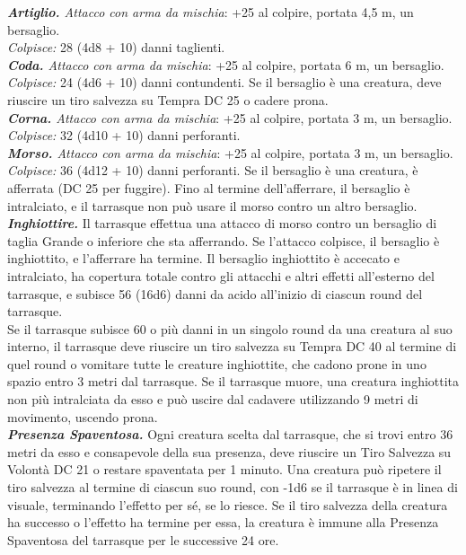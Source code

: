 \begin{multicols}{2}
\emph{\textbf{Artiglio.} Attacco con arma da mischia}: +25 al colpire, portata 4,5 m, un bersaglio.\\
\emph{Colpisce:} 28 (4d8 + 10) danni taglienti. \\
\emph{\textbf{Coda.} Attacco con arma da mischia}: +25 al colpire, portata 6 m, un bersaglio.\\
\emph{Colpisce:} 24 (4d6 + 10) danni contundenti. Se il bersaglio è una creatura, deve riuscire un tiro salvezza su Tempra DC  25 o cadere prona.\\
\emph{\textbf{Corna.} Attacco con arma da mischia}: +25 al colpire, portata 3 m, un bersaglio.\\
\emph{Colpisce:} 32 (4d10 + 10) danni perforanti.\\
\emph{\textbf{Morso.} Attacco con arma da mischia}: +25 al colpire, portata 3 m, un bersaglio.\\
\emph{Colpisce:} 36 (4d12 + 10) danni perforanti. Se il bersaglio è una creatura, è afferrata (DC  25 per fuggire). Fino al termine dell'afferrare, il bersaglio è intralciato, e il tarrasque non può usare il morso contro un altro bersaglio.\\
\emph{\textbf{Inghiottire.}} Il tarrasque effettua una attacco di morso contro un bersaglio di taglia Grande o inferiore che sta afferrando. Se l'attacco colpisce, il bersaglio è inghiottito, e l'afferrare ha termine. Il bersaglio inghiottito è accecato e intralciato, ha copertura totale contro gli attacchi e altri effetti all'esterno del tarrasque, e subisce 56 (16d6) danni da acido all'inizio di ciascun round del tarrasque.\\
Se il tarrasque subisce 60 o più danni in un singolo round da una creatura al suo interno, il tarrasque deve riuscire un tiro salvezza su Tempra DC  40 al termine di quel round o vomitare tutte le creature inghiottite, che cadono prone in uno spazio entro 3 metri dal tarrasque. Se il tarrasque muore, una creatura inghiottita non più intralciata da esso e può uscire dal cadavere utilizzando 9 metri di movimento, uscendo prona.\\
\emph{\textbf{Presenza Spaventosa.}} Ogni creatura scelta dal tarrasque, che si trovi entro 36 metri da esso e consapevole della sua presenza, deve riuscire un Tiro Salvezza su Volontà DC  21 o restare spaventata per 1 minuto. Una creatura può ripetere il tiro salvezza al termine di ciascun suo round, con -1d6 se il tarrasque è in linea di visuale, terminando l'effetto per sé, se lo riesce. Se il tiro salvezza della creatura ha successo o l'effetto ha termine per essa, la creatura è immune alla Presenza Spaventosa del tarrasque per le successive 24 ore.\\

\end{multicols}
